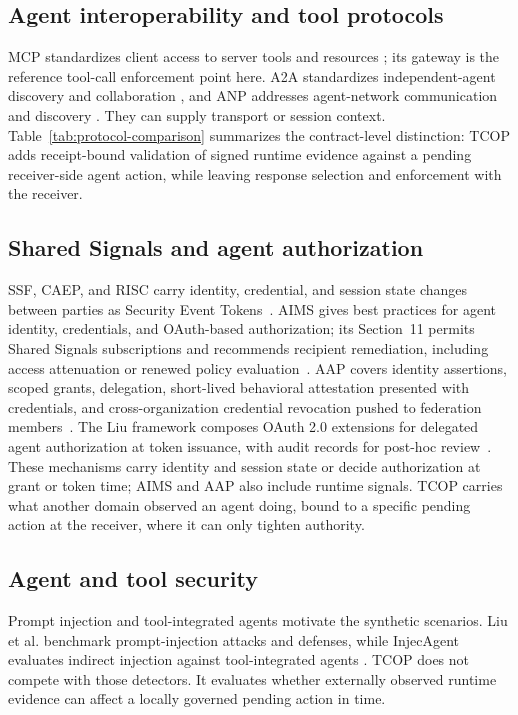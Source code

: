 \subsection{Agent interoperability and tool protocols}

MCP standardizes client access to server tools and resources \cite{mcpAuthorization}; its gateway is the reference tool-call enforcement point here. A2A standardizes independent-agent discovery and collaboration \cite{a2aSpec}, and ANP addresses agent-network communication and discovery \cite{anpSpec}. They can supply transport or session context. Table~\ref{tab:protocol-comparison} summarizes the contract-level distinction: TCOP adds receipt-bound validation of signed runtime evidence against a pending receiver-side agent action, while leaving response selection and enforcement with the receiver.

\subsection{Shared Signals and agent authorization}

SSF, CAEP, and RISC carry identity, credential, and session state changes between parties as Security Event Tokens~\cite{openid-ssf-1.0,openid-caep-1.0,openid-risc-1.0,rfc8417}. AIMS gives best practices for agent identity, credentials, and OAuth-based authorization; its Section~11 permits Shared Signals subscriptions and recommends recipient remediation, including access attenuation or renewed policy evaluation~\cite{draft-ietf-wimse-aims}. AAP covers identity assertions, scoped grants, delegation, short-lived behavioral attestation presented with credentials, and cross-organization credential revocation pushed to federation members~\cite{draft-fane-opena2a-aap}. The Liu framework composes OAuth 2.0 extensions for delegated agent authorization at token issuance, with audit records for post-hoc review~\cite{draft-liu-ai-agent-authorization-integration}. These mechanisms carry identity and session state or decide authorization at grant or token time; AIMS and AAP also include runtime signals. TCOP carries what another domain observed an agent doing, bound to a specific pending action at the receiver, where it can only tighten authority.

\subsection{Agent and tool security}

Prompt injection and tool-integrated agents motivate the synthetic scenarios. Liu et al. benchmark prompt-injection attacks and defenses, while InjecAgent evaluates indirect injection against tool-integrated agents \cite{liu2024prompt,zhan2024injecagent}. TCOP does not compete with those detectors. It evaluates whether externally observed runtime evidence can affect a locally governed pending action in time.
